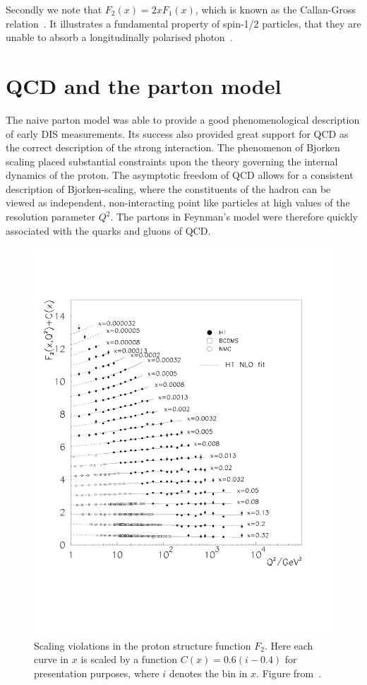 Secondly we note that $F_2(x) = 2xF_1(x)$, which is known as the Callan-Gross relation~\cite{callangross}. It illustrates a fundamental property of spin-1/2 particles, that they are unable to absorb a longitudinally polarised photon~\cite{pQCDhandbook}.
%
\section{QCD and the parton model}
The naive parton model was able to provide a good phenomenological description of early DIS measurements. Its success also provided great support for QCD as the correct description of the strong interaction. The phenomenon of Bjorken scaling placed substantial constraints upon the theory governing the internal dynamics of the proton. The asymptotic freedom of QCD allows for a consistent description of Bjorken-scaling, where the constituents of the hadron can be viewed as independent, non-interacting point like particles at high  values of the resolution parameter $Q^2$. The partons in Feynman's model were therefore quickly associated with the quarks and gluons of QCD.
\begin{figure}[t]
\centering
\includegraphics[scale=0.5]{2-PDFs/figs/d96-039f11.pdf}
\caption[Scaling violations in the proton structure function $F_2$]{Scaling violations in the proton structure function $F_2$. Here each curve in $x$ is scaled by a function $C(x)= 0.6(i- 0.4)$ for presentation purposes, where $i$ denotes the bin in $x$. Figure from~\cite{Aid:1996au}.}
\label{fig:F2H1}
\end{figure}

